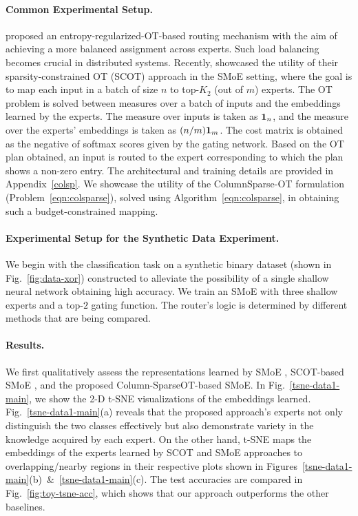 \paragraph{Common Experimental Setup.}
\citet{clark2022unified} proposed an entropy-regularized-OT-based routing mechanism with the aim of achieving a more balanced assignment across experts. Such load balancing becomes crucial in distributed systems.
Recently, \citet{liu2023sparsityconstrained} showcased the utility of their sparsity-constrained OT (SCOT) approach in the SMoE setting, where the goal is to map each input in a batch of size $n$ to top-$K_2$ (out of $m$) experts. The OT problem is solved between measures over a batch of inputs and the embeddings learned by the experts. The measure over inputs is taken as $\mathbf{1}_n$, and the measure over the experts' embeddings is taken as $(n/m)\mathbf{1}_m$. The cost matrix is obtained as the negative of softmax scores given by the gating network. Based on the OT plan obtained, an input is routed to the expert corresponding to which the plan shows a non-zero entry. The architectural and training details are provided in Appendix~\ref{colsp}. We showcase the utility of the ColumnSparse-OT formulation (Problem~\ref{eqn:colsparse}), solved using Algorithm~\ref{eqn:colsparse}, in obtaining such a budget-constrained mapping.

\paragraph{Experimental Setup for the Synthetic Data Experiment.} We begin with the classification task on a synthetic binary dataset (shown in Fig.~\ref{fig:data-xor}) constructed to alleviate the possibility of a single shallow neural network obtaining high accuracy. We train an SMoE with three shallow experts and a top-$2$ gating function. The router's logic is determined by different methods that are being compared.
\paragraph{Results.}
We first qualitatively assess the representations learned by  SMoE \citep{shazeer2017}, SCOT-based SMoE \citep{liu2023sparsityconstrained}, and the proposed Column-SparseOT-based SMoE. In Fig.~\ref{tsne-data1-main}, we show the 2-D t-SNE visualizations \citep{vandermaaten08a} of the embeddings learned. Fig.~\ref{tsne-data1-main}(a) reveals that the proposed approach's experts not only distinguish the two classes effectively but also demonstrate variety in the knowledge acquired by each expert. On the other hand, t-SNE maps the embeddings of the experts learned by SCOT and SMoE approaches to overlapping/nearby regions in their respective plots shown in Figures~\ref{tsne-data1-main}(b)~\&~\ref{tsne-data1-main}(c). The test accuracies are compared in Fig.~\ref{fig:toy-tsne-acc}, which shows that our approach outperforms the other baselines.

